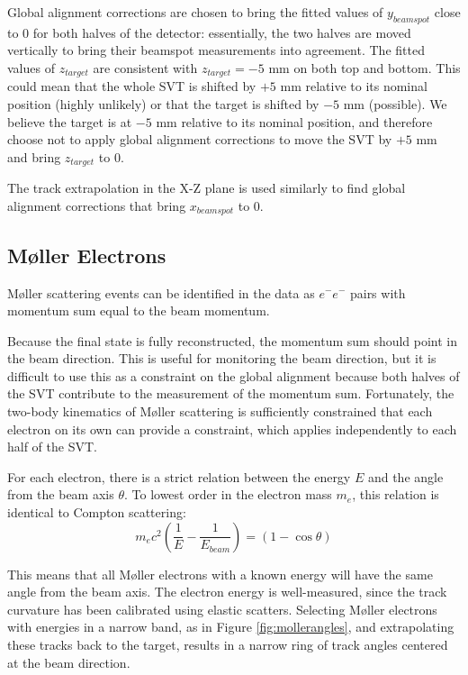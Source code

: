 Global alignment corrections are chosen to bring the fitted values of $y_{beamspot}$ close to 0 for both halves of the detector: essentially, the two halves are moved vertically to bring their beamspot measurements into agreement.
The fitted values of $z_{target}$ are consistent with $z_{target}=-5$ mm on both top and bottom.
This could mean that the whole SVT is shifted by $+5$ mm relative to its nominal position (highly unlikely) or that the target is shifted by $-5$ mm (possible).
We believe the target is at $-5$ mm relative to its nominal position, and therefore choose not to apply global alignment corrections to move the SVT by $+5$ mm and bring $z_{target}$ to 0.

The track extrapolation in the X-Z plane is used similarly to find global alignment corrections that bring $x_{beamspot}$ to 0.

\subsection{M{\o}ller Electrons}
\label{sec:mollers}

M{\o}ller scattering events can be identified in the data as $e^-e^-$ pairs with momentum sum equal to the beam momentum.

Because the final state is fully reconstructed, the momentum sum should point in the beam direction.
This is useful for monitoring the beam direction, but it is difficult to use this as a constraint on the global alignment because both halves of the SVT contribute to the measurement of the momentum sum.
Fortunately, the two-body kinematics of M{\o}ller scattering is sufficiently constrained that each electron on its own can provide a constraint, which applies independently to each half of the SVT.

For each electron, there is a strict relation between the energy $E$ and the angle from the beam axis $\theta$.
To lowest order in the electron mass $m_e$, this relation is identical to Compton scattering:
\begin{equation}
    m_e c^2 \left(\frac{1}{E} - \frac{1}{E_{beam}}\right) = (1-\cos{\theta})
    \label{eq:moller_etheta}
\end{equation}

This means that all M{\o}ller electrons with a known energy will have the same angle from the beam axis.
The electron energy is well-measured, since the track curvature has been calibrated using elastic scatters.
Selecting M{\o}ller electrons with energies in a narrow band, as in Figure \ref{fig:mollerangles}, and extrapolating these tracks back to the target, results in a narrow ring of track angles centered at the beam direction.

